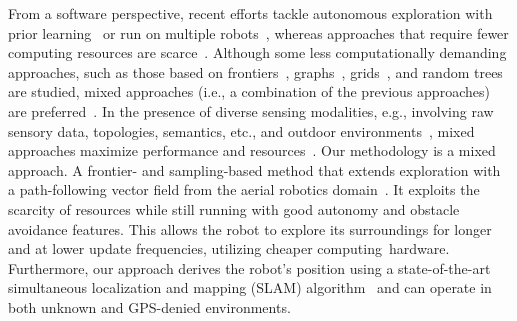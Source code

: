\documentclass[letterpaper,10pt,conference,twoside]{IEEEtran}
\theoremstyle{definition}
\begin{document}
From a software perspective, 
recent efforts tackle autonomous exploration with prior learning~\cite{shrestha2019learned} or run on multiple robots~\cite{kulkarni2022autonomous,tranzatto2022cerberus,roucek2020darpa}, whereas %
approaches %
that require fewer computing resources are scarce~\cite{bircher2016receding,batinovic2021multi,faisal2021low,muller2021openbot}. 
%
Although some less computationally demanding approaches, such as those based on frontiers~\cite{kim2022autonomous,roucek2020darpa,batinovic2021multi}, graphs~\cite{kulkarni2022autonomous,tranzatto2022cerberus,dang2019graph}, grids~\cite{corah2019communication,tabib2022autonomous}, and random trees are studied, mixed approaches (i.e., a combination of the previous approaches) are preferred~\cite{shrestha2019learned,bircher2016receding,surmann2003autonomous,qiao2019sampling,dai2020fast}. In the presence of diverse sensing modalities, e.g., involving raw sensory data, topologies, semantics, etc., and outdoor environments~\cite{placed2022survey,batinovic2021multi}, mixed approaches %
maximize performance and resources~\cite{placed2022survey,bircher2016receding}. 
%
%
Our methodology is %
a mixed approach. A frontier- and sampling-based method that extends exploration %
with a path-following vector field %
from the aerial robotics domain~\cite{seewald2022energy,garcia2017guidance,seewaldphdthesis}. It
exploits the scarcity of resources while still running %
with good autonomy and obstacle avoidance features. %
%
This allows the robot to explore its surroundings for longer and at lower update frequencies, %
utilizing cheaper computing~hardware. %
Furthermore, our %
approach derives the 
robot's 
position using a state-of-the-art 
simultaneous localization and mapping (SLAM) %
algorithm~\cite{labbe2019rtab} and %
can operate in both unknown and GPS-denied environments. 
\end{document}
